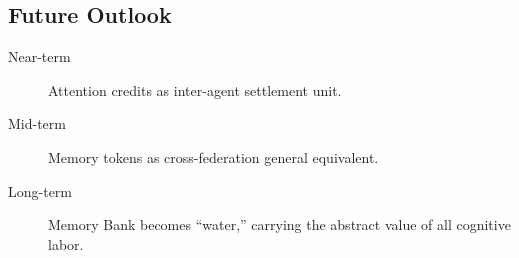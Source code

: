 \documentclass[11pt,a4paper]{article}
\begin{document}
\subsection{Future Outlook}
\label{sub:outlook}

\begin{description}
  \item[Near-term] Attention credits as inter-agent settlement unit.
  \item[Mid-term] Memory tokens as cross-federation general equivalent.
  \item[Long-term] Memory Bank becomes ``water,'' carrying the abstract value of all cognitive labor.
\end{description}

\end{document}
